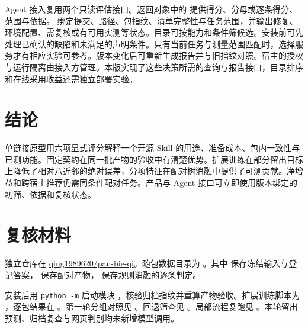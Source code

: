 \documentclass[final,5p,twocolumn,10pt]{elsarticle}
\newcommand{\code}[1]{\texttt{#1}}
\begin{document}
Agent 接入复用两个只读评估接口。返回对象中的  提供得分、分母或逐条得分、范围与依据。 绑定提交、路径、包指纹、清单完整性与任务范围，并输出修复、环境配置、需复核或有可用实测等状态。目录可按能力和条件筛候选。安装前可先处理已确认的缺陷和未满足的声明条件。只有当前任务与测量范围匹配时，选择服务才有相应实验可参考。版本变化后可重新生成报告并与旧指纹对照。宿主的授权与运行隔离由接入方管理。本版实现了这些决策所需的查询与报告接口，目录排序和在线采用收益还需独立部署实验。

\section{结论}

单链接原型用六项显式评分解释一个开源 Skill 的用途、准备成本、包内一致性与已测功能。固定契约在同一批产物的验收中有清楚优势。扩展训练在部分留出目标上降低了相对八近邻的绝对误差，分项特征在配对树消融中提供了可测贡献。净增益和跨宿主推荐仍需同条件配对任务。产品与 Agent 接口可立即使用版本绑定的初筛、依据和复核状态。

\section*{复核材料}

独立仓库在 \href{https://github.com/qing1989620/pan-bie-qi}{qing1989620/pan-bie-qi}。随包数据目录为 。其中  保存冻结输入与登记答案， 保存配对产物， 保存规则消融的逐条判定。

安装后用 \code{python -m} 启动模块 ，核验归档指纹并重算产物验收。扩展训练脚本为 ，逐包结果在 。第一轮分组对照见 。回退筛查见 。局部流程复跑见 。本轮留出预测、归档复查与网页判别均未新增模型调用。
\end{document}
